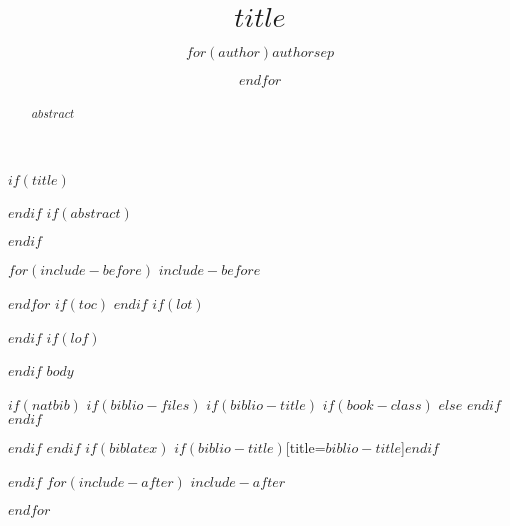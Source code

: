 \documentclass[$fontsize$,$lang$,$papersize$,$for(classoption)$$classoption$$sep$,$endfor$]{article}
\title{$title$}
\author{$for(author)$$author$$sep$ \and $endfor$}
\date{}
\theoremstyle{definition}
\begin{document}
$if(title)$
\maketitle
$endif$
$if(abstract)$
\begin{abstract}
$abstract$
\end{abstract}
$endif$

$for(include-before)$
$include-before$

$endfor$
$if(toc)$
{
\hypersetup{linkcolor=black}
\setcounter{tocdepth}{$toc-depth$}
\tableofcontents
}
$endif$
$if(lot)$
\listoftables
$endif$
$if(lof)$
\listoffigures
$endif$
$body$

$if(natbib)$
$if(biblio-files)$
$if(biblio-title)$
$if(book-class)$
\renewcommand\bibname{$biblio-title$}
$else$
\renewcommand\refname{$biblio-title$}
$endif$
$endif$


$endif$
$endif$
$if(biblatex)$
\printbibliography$if(biblio-title)$[title=$biblio-title$]$endif$

$endif$
$for(include-after)$
$include-after$

$endfor$
\end{document}

